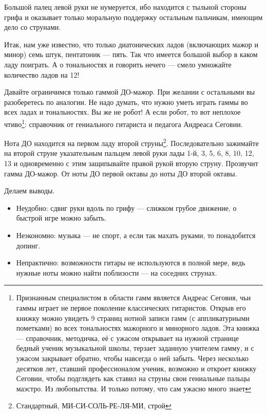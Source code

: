 Большой палец левой руки не нумеруется, ибо находится с тыльной стороны грифа и оказывает только моральную поддержку остальным пальчикам, имеющим дело со струнами.

Итак, нам уже известно, что только диатонических ладов (включающих мажор и минор) семь штук, пентатоник --- пять. Так что имеется большой выбор в каком ладу поиграть. А о тональностях и говорить нечего --- смело умножайте количество ладов на 12!

Давайте ограничимся только гаммой ДО-мажор. При желании с остальными вы разоберетесь по аналогии. Не надо думать, что нужно уметь играть гаммы во всех ладах и тональностях. Вы же не робот! А если робот, то вот неплохое чтиво\footnote{Признанным специалистом в области гамм является Андреас Сеговия, чьи гаммы играет не первое поколение классических гитаристов. Открыв его книжку \cite{bib:segovia:Scales} можно увидеть 9 страниц нотной записи гамм (с аппликатурными пометками) во всех тональностях мажорного и минорного ладов. Эта книжка --- справочник, методичка, её с ужасом открывает на нужной странице бедный ученик музыкальной школы, терзает заданную учителем гамму, и с ужасом закрывает обратно, чтобы навсегда о ней забыть. Через несколько десятков лет, ставший профессионалом ученик, возможно и откроет книжку Сеговии, чтобы подглядеть как ставил на струны свои гениальные пальцы маэстро. Из любопытства. И только потому, что сам ужасно много знает}: \cite{bib:segovia:Scales} справочник от гениального гитариста и педагога Андреаса Сеговии.

\begin{Example}
    \label{ex:harmony:scales:d:maj}
    
    Нота ДО находится на первом ладу второй струны\footnote{Стандартный, МИ-СИ-СОЛЬ-РЕ-ЛЯ-МИ, строй}. Последовательно зажимайте на второй струне указательным пальцем левой руки лады 1-й, 3, 5, 6, 8, 10, 12, 13 и одновременно с этим защипывайте правой рукой вторую струну. Прозвучит гамма ДО-мажор. От ноты ДО первой октавы до ноты ДО второй октавы. 
    
    Делаем выводы.
    \begin{itemize}
        \item Неудобно: сдвиг руки вдоль по грифу --- слижком грубое движение, о быстрой игре можно забыть.
        \item Неэкономно: музыка --- не спорт, а если так махать руками, то понадобится допинг.
        \item Непрактично: возможности гитары не используются в полной мере, ведь нужные ноты можно найти поблизости --- на соседних струнах.
    \end{itemize}
\end{Example}

